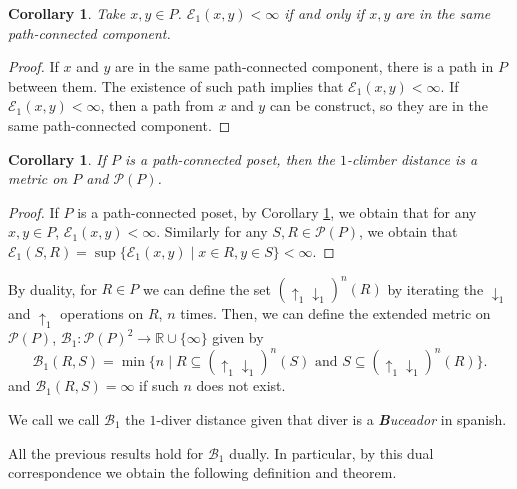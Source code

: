 \documentclass{article}[12pt]
\theoremstyle{exampstyle}
\newtheorem{corollary}[theorem]{Corollary}
\theoremstyle{remark}
\newcommand{\R}{\mathbb{R}}
\newcommand{\B}{\mathcal{B}}
\newcommand{\E}{\mathcal{E}}
\renewcommand{\P}{\mathcal{P}}
\newcommand{\downup}[1][]{ \uparrow_{#1} \downarrow_{#1}}
\begin{document}
\begin{corollary}
    Take $x,y \in P$. $\E_1(x,y) < \infty$ if and only if $x,y$ are in the same path-connected component. 
    \label{coro:finite_if_connected_1}
\end{corollary}
\begin{proof}
    If $x$ and $y$ are in the same path-connected component, there is a path in $P$ between them. The existence of such path implies that $\E_1(x,y) < \infty$. If $\E_1(x,y) < \infty$, then a path from $x$ and $y$ can be construct, so they are in the same path-connected component.
\end{proof}

\begin{corollary}
    If $P$ is a path-connected poset, then the $1$-climber distance is a metric on $P$ and $\P(P)$.
\end{corollary}
\begin{proof}
    If $P$ is a path-connected poset, by Corollary \ref{coro:finite_if_connected_1}, we obtain that for any $x,y \in P$, $\E_1(x,y) < \infty$. Similarly for any $S,R \in \P(P)$, we obtain that $\E_1(S,R) = \sup\{\E_1(x,y) \mid x \in R, y \in S\} < \infty$.
\end{proof}

 By duality, for $R \in P$ we can define the set $(\downup[1])^n(R)$ by iterating the $\downarrow_1$ and $\uparrow_1$ operations on $R$, $n$ times. Then, we can define the extended metric on $\P(P)$, $\B_1: \P(P)^ 2 \to \R \cup \{ \infty\}$ given by 
    \begin{equation*}
        \B_1(R,S) = \min \{ n \mid R \subseteq (\downup[1])^{n} (S) \text{ and } S \subseteq (\downup[1])^{n} (R)\}.
    \end{equation*}
    and $\B_1(R,S) = \infty$ if such $n$ does not exist.

We call we call $\B_1$ the $1$-diver distance given that diver is a \textit{\textbf{B}uceador} in spanish.

All the previous results hold for $\B_1$ dually. In particular, by this dual correspondence we obtain the following definition and theorem.
\end{document}
